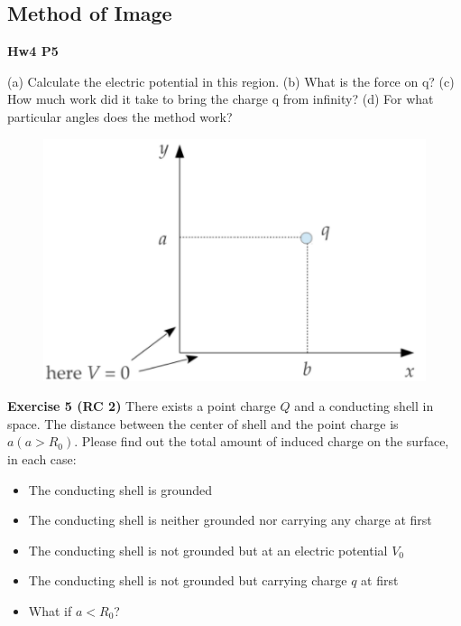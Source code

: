 \documentclass{beamer}
\begin{document}

\subsection{\bf Method of Image}


\begin{frame}{\bf Hw4 P5}
    
(a) Calculate the electric potential in this region. 
(b) What is the force on q? (c) How much work did it take to bring the charge q from inﬁnity? 
(d) For what particular angles does the method work?
    
\begin{figure}
    \centering
    \includegraphics[scale=0.75]{images/ex5.png}
\end{figure}

\end{frame}


\begin{frame}{\bf Exercise 5 (RC 2)}
    There exists a point charge $Q$ and a conducting shell in space. The distance between the center of shell 
    and the point charge is $a(a>R_0)$. Please find out the total amount of induced charge on the surface, in each case:
    \begin{itemize}
        \item The conducting shell is grounded
        \item The conducting shell is neither grounded nor carrying any charge at first
        \item The conducting shell is not grounded but at an electric potential $V_0$
        \item The conducting shell is not grounded but carrying charge $q$ at first
        \item What if $a<R_0$?
    \end{itemize}
\end{frame}
\end{document}
